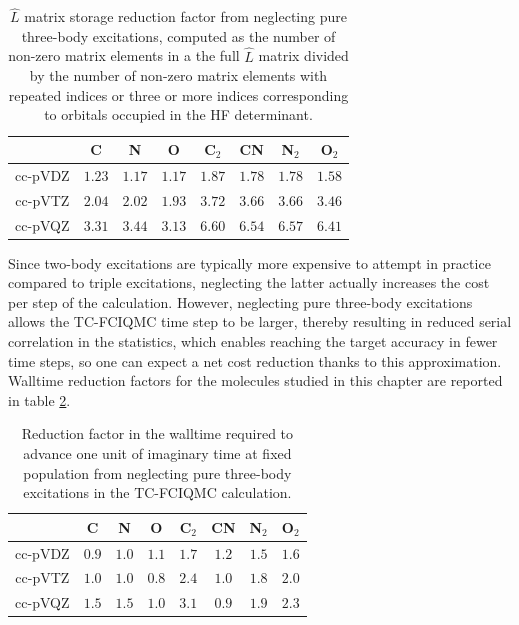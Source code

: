 \begin{table}[htbp]
    \centering
    \begin{tabular}{cccccccc}
            & C      & N      & O      &
              C$_2$  & CN     & N$_2$  & O$_2$  \\
    \hline \hline
    cc-pVDZ & $1.23$ & $1.17$ & $1.17$ &
              $1.87$ & $1.78$ & $1.78$ & $1.58$ \\
    cc-pVTZ & $2.04$ & $2.02$ & $1.93$ &
              $3.72$ & $3.66$ & $3.66$ & $3.46$ \\
    cc-pVQZ & $3.31$ & $3.44$ & $3.13$ &
              $6.60$ & $6.54$ & $6.57$ & $6.41$ \\
    \hline
    \end{tabular}
    \caption{
      $\hat L$ matrix storage reduction factor from neglecting
      pure three-body excitations, computed as the number of
      non-zero matrix elements in a the full $\hat L$ matrix
      divided by the number of non-zero matrix elements with
      repeated indices or three or more indices corresponding to
      orbitals occupied in the HF determinant.
    }
    \label{table:no3_memory}
\end{table}

Since two-body excitations are typically more expensive to attempt in practice compared to triple excitations, neglecting the latter actually increases the cost per step of the calculation. However, neglecting pure three-body excitations allows the TC-FCIQMC time step to be larger, thereby resulting in reduced serial correlation in the statistics, which enables reaching the target accuracy in fewer time steps, so one can expect a net cost reduction thanks to this approximation. Walltime reduction factors for the molecules studied in this chapter are reported in table \ref{table:no3_cost}.
\begin{table}[htbp]
    \centering
    \begin{tabular}{cccccccc}
            & C     & N     & O     &
              C$_2$ & CN    & N$_2$ & O$_2$ \\
    \hline \hline
    cc-pVDZ & $0.9$ & $1.0$ & $1.1$ &
              $1.7$ & $1.2$ & $1.5$ & $1.6$ \\
    cc-pVTZ & $1.0$ & $1.0$ & $0.8$ &
              $2.4$ & $1.0$ & $1.8$ & $2.0$ \\
    cc-pVQZ & $1.5$ & $1.5$ & $1.0$ &
              $3.1$ & $0.9$ & $1.9$ & $2.3$ \\
    \hline
    \end{tabular}
    \caption{
      Reduction factor in the walltime required to advance one unit of
      imaginary time at fixed population from neglecting pure three-body
      excitations in the TC-FCIQMC calculation.
      \label{table:no3_cost}}
\end{table}

